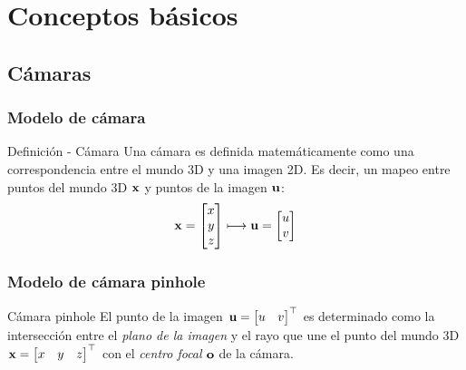 \documentclass[compress]{beamer}
\begin{document}
\section{Conceptos básicos}


\subsection{Cámaras}


\begin{frame}
\frametitle{Modelo de cámara}

\begin{block}{Definición - Cámara}
Una cámara es definida matemáticamente como una correspondencia entre el mundo 3D y una imagen 2D. Es decir, un mapeo entre puntos del mundo 3D $\boldsymbol{\mathbf{x}}$ y puntos de la imagen $\boldsymbol{\mathbf{u}}$:
\begin{equation}
\boldsymbol{\mathbf{x}}=\begin{bmatrix}x\\
y\\
z
\end{bmatrix}\longmapsto
\boldsymbol{\mathbf{u}}=\begin{bmatrix}u\\
v
\end{bmatrix}
\end{equation}
\end{block}

\end{frame}


\begin{frame}
\frametitle{Modelo de cámara pinhole}



\begin{block}{Cámara pinhole}
El punto de la imagen $\boldsymbol{\mathbf{u}}=\begin{bmatrix}u & v\end{bmatrix}^{\top}$ es determinado como la intersección entre el \emph{plano de la imagen} y el rayo que une el punto del mundo 3D $\boldsymbol{\mathbf{x}}=\begin{bmatrix}x & y & z\end{bmatrix}^{\top}$ con el \emph{centro focal} $\boldsymbol{\mathbf{o}}$ de la cámara.
\end{block}

\begin{figure}[!htb]
	\centering
	\hfill
\end{figure}

\end{frame}
\end{document}
